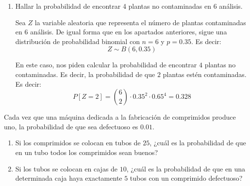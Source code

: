 \begin{ejercicio}
\begin{enumerate}
        \item Hallar la probabilidad de encontrar 4 plantas no contaminadas en 6 análisis.
        
        Sea $Z$ la variable aleatoria que representa el número de plantas contaminadas en $6$ análisis.
        De igual forma que en los apartados anteriores, sigue una distribución de probabilidad binomial con $n=6$ y $p=0.35$. Es decir:
        \begin{equation*}
            Z \sim B(6,0.35)
        \end{equation*}

        En este caso, nos piden calcular la probabilidad de encontrar $4$ plantas no contaminadas. Es decir, la probabilidad de que $2$ plantas estén contaminadas. Es decir:
        \begin{equation*}
            P[Z=2] = \binom{6}{2} \cdot 0.35^2 \cdot 0.65^4 = 0.328
        \end{equation*}
    \end{enumerate}
    
\end{ejercicio}

\begin{ejercicio}
    Cada vez que una máquina dedicada a la fabricación de comprimidos produce uno, la probabilidad
    de que sea defectuoso es $0.01$.
    \begin{enumerate}
        \item Si los comprimidos se colocan en tubos de $25$, ¿cuál es la probabilidad de que en un tubo todos
        los comprimidos sean buenos?

        \item Si los tubos se colocan en cajas de $10$, ¿cuál es la probabilidad de que en una determinada caja
        haya exactamente $5$ tubos con un comprimido defectuoso?
    \end{enumerate}
\end{ejercicio}


